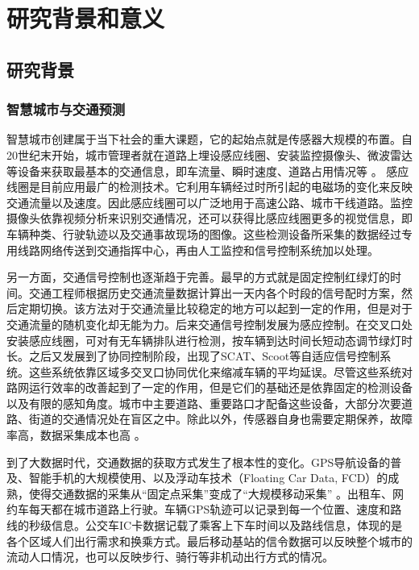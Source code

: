 
\chapter{研究背景和意义}

\section{研究背景}

\subsection{智慧城市与交通预测}

智慧城市创建属于当下社会的重大课题，它的起始点就是传感器大规模的布置。自20世纪末开始，城市管理者就在道路上埋设感应线圈、安装监控摄像头、微波雷达等设备来获取最基本的交通信息，即车流量、瞬时速度、道路占用情况等 。
感应线圈是目前应用最广的检测技术。它利用车辆经过时所引起的电磁场的变化来反映交通流量以及速度。因此感应线圈可以广泛地用于高速公路、城市干线道路。监控摄像头依靠视频分析来识别交通情况，还可以获得比感应线圈更多的视觉信息，即车辆种类、行驶轨迹以及交通事故现场的图像。这些检测设备所采集的数据经过专用线路网络传送到交通指挥中心，再由人工监控和信号控制系统加以处理。

另一方面，交通信号控制也逐渐趋于完善。最早的方式就是固定控制红绿灯的时间。交通工程师根据历史交通流量数据计算出一天内各个时段的信号配时方案，然后定期切换。该方法对于交通流量比较稳定的地方可以起到一定的作用，但是对于交通流量的随机变化却无能为力。后来交通信号控制发展为感应控制。在交叉口处安装感应线圈，可对有无车辆排队进行检测，按车辆到达时间长短动态调节绿灯时长。之后又发展到了协同控制阶段，出现了SCAT、Scoot等自适应信号控制系统。这些系统依靠区域多交叉口协同优化来缩减车辆的平均延误。尽管这些系统对路网运行效率的改善起到了一定的作用，但是它们的基础还是依靠固定的检测设备以及有限的感知角度。城市中主要道路、重要路口才配备这些设备，大部分次要道路、街道的交通情况处在盲区之中。除此以外，传感器自身也需要定期保养，故障率高，数据采集成本也高 。

到了大数据时代，交通数据的获取方式发生了根本性的变化。GPS导航设备的普及、智能手机的大规模使用、以及浮动车技术（Floating Car Data, FCD）的成熟，使得交通数据的采集从“固定点采集”变成了“大规模移动采集” 。出租车、网约车每天都在城市道路上行驶。车辆GPS轨迹可以记录到每一个位置、速度和路线的秒级信息。公交车IC卡数据记载了乘客上下车时间以及路线信息，体现的是各个区域人们出行需求和换乘方式。最后移动基站的信令数据可以反映整个城市的流动人口情况，也可以反映步行、骑行等非机动出行方式的情况。

